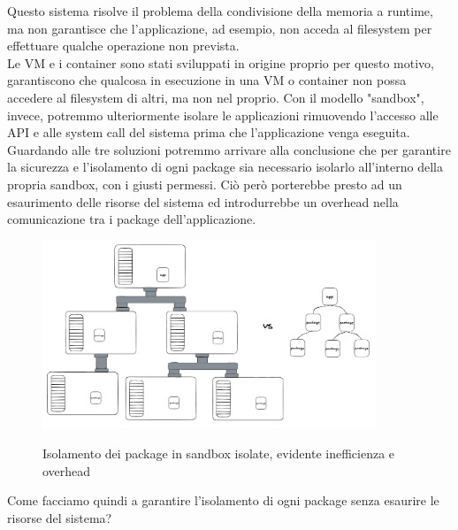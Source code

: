 Questo sistema risolve il problema della condivisione della memoria a runtime, ma non garantisce che l'applicazione, ad
esempio, non acceda al filesystem per effettuare qualche operazione non prevista.\\ 
Le VM e i container sono stati sviluppati in origine proprio per questo motivo, garantiscono che qualcosa in esecuzione
in una VM o container non possa accedere al filesystem di altri, ma non nel proprio. Con il modello "sandbox", invece,
potremmo ulteriormente isolare le applicazioni rimuovendo l'accesso alle API e alle system call del sistema prima che
l'applicazione venga eseguita. Guardando alle tre soluzioni potremmo arrivare alla conclusione che per garantire la
sicurezza e l'isolamento di ogni package sia necessario isolarlo all'interno della propria sandbox, con i giusti
permessi. Ciò però porterebbe presto ad un esaurimento delle risorse del sistema ed introdurrebbe un overhead nella
comunicazione tra i package dell'applicazione. 
\begin{figure}[H]
    \centering
    \captionsetup{justification=centering}
    \includegraphics[width=10cm]{./chapters/2.wasi-in-depth/images/3.package_isolation_processes.png}
    \label{process_package_in_sandbox}
    \caption{Isolamento dei package in sandbox isolate, evidente inefficienza e overhead}
\end{figure}
Come facciamo quindi a garantire l'isolamento di ogni package senza esaurire le risorse del sistema?
